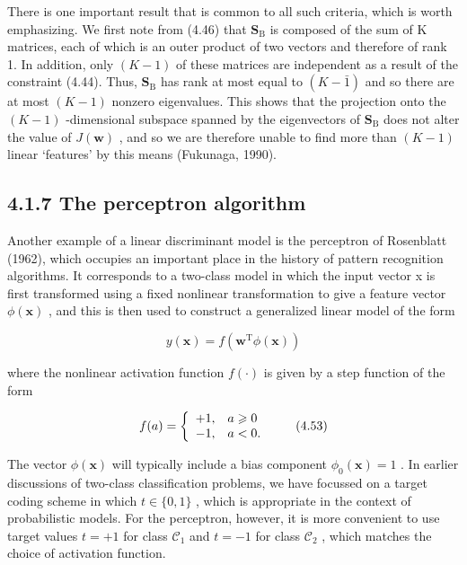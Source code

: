 \documentclass[
  10
]{article}
\begin{document}
There is one important result that is common to all such criteria, which
is worth emphasizing. We first note from (4.46) that
\(\mathbf { S } _ { \mathrm { B } }\) is composed of the sum of K
matrices, each of which is an outer product of two vectors and therefore
of rank 1. In addition, only \(( K - 1 )\) of these matrices are
independent as a result of the constraint (4.44). Thus,
\(\mathbf { S } _ { \mathrm { B } }\) has rank at most equal to
\(( K - \bar { 1 } )\) and so there are at most \(( K - 1 )\) nonzero
eigenvalues. This shows that the projection onto the \(( K - 1 )\)
-dimensional subspace spanned by the eigenvectors of
\(\mathbf { S } _ { \mathrm { B } }\) does not alter the value of
\(J ( \mathbf { w } )\) , and so we are therefore unable to find more
than \(( K - 1 )\) linear `features' by this means (Fukunaga, 1990).

\subsection{4.1.7 The perceptron
algorithm}\label{the-perceptron-algorithm}

Another example of a linear discriminant model is the perceptron of
Rosenblatt (1962), which occupies an important place in the history of
pattern recognition algorithms. It corresponds to a two-class model in
which the input vector x is first transformed using a fixed nonlinear
transformation to give a feature vector \(\phi ( \mathbf { x } )\) , and
this is then used to construct a generalized linear model of the form

\[
y (\mathbf {x}) = f \left(\mathbf {w} ^ {\mathrm{T}} \phi (\mathbf {x})\right)\tag{4.52}
\]

where the nonlinear activation function \(f ( \cdot )\) is given by a
step function of the form

\[
f (a) = \left\{ \begin{array}{l l} + 1, & a \geqslant 0 \\ - 1, & a <   0. \end{array} \right.\tag{4.53}
\]

The vector \(\phi ( \mathbf { x } )\) will typically include a bias
component \(\phi _ { 0 } ( \mathbf { x } ) = 1\) . In earlier
discussions of two-class classification problems, we have focussed on a
target coding scheme in which \(t \in \{ 0 , 1 \}\) , which is
appropriate in the context of probabilistic models. For the perceptron,
however, it is more convenient to use target values \(t = + 1\) for
class \(\mathcal { C } _ { 1 }\) and \(t = - 1\) for class
\(\mathcal { C } _ { 2 }\) , which matches the choice of activation
function.
\end{document}
